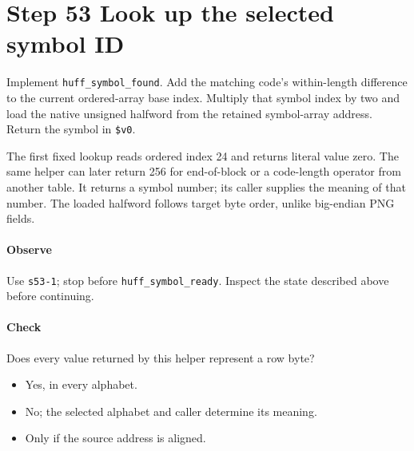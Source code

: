 \section{Step 53 Look up the selected symbol ID}\label{png-huff-s53}
Implement \texttt{huff\_symbol\_found}. Add the matching code's within-length difference to the current ordered-array base index. Multiply that symbol index by two and load the native unsigned halfword from the retained symbol-array address. Return the symbol in \texttt{\$v0}.

The first fixed lookup reads ordered index 24 and returns literal value zero. The same helper can later return 256 for end-of-block or a code-length operator from another table. It returns a symbol number; its caller supplies the meaning of that number. The loaded halfword follows target byte order, unlike big-endian PNG fields.

\paragraph{Observe} Use \texttt{s53-1}; stop before \texttt{huff\_symbol\_ready}. Inspect the state described above before continuing.

\paragraph{Check} Does every value returned by this helper represent a row byte?
\begin{itemize}
\item[A.] Yes, in every alphabet.
\item[B.] No; the selected alphabet and caller determine its meaning.
\item[C.] Only if the source address is aligned.
\end{itemize}
